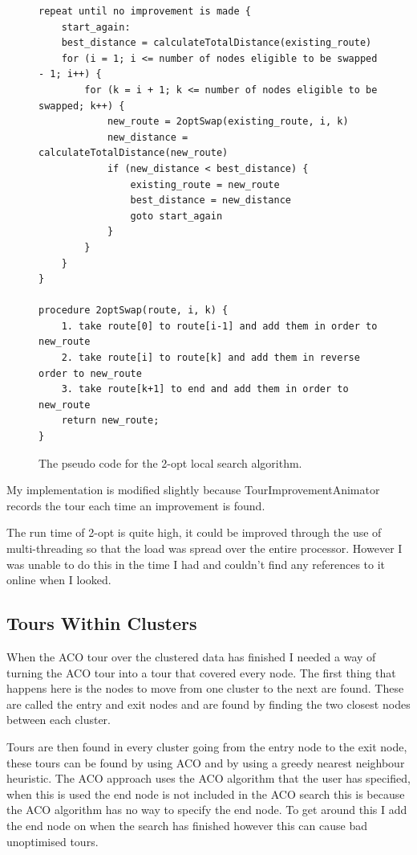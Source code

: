 \begin{figure}
\begin{verbatim}
repeat until no improvement is made {
    start_again:
    best_distance = calculateTotalDistance(existing_route)
    for (i = 1; i <= number of nodes eligible to be swapped - 1; i++) {
        for (k = i + 1; k <= number of nodes eligible to be swapped; k++) {
            new_route = 2optSwap(existing_route, i, k)
            new_distance = calculateTotalDistance(new_route)
            if (new_distance < best_distance) {
                existing_route = new_route
                best_distance = new_distance
                goto start_again
            }
        }
    }
}

procedure 2optSwap(route, i, k) {
    1. take route[0] to route[i-1] and add them in order to new_route
    2. take route[i] to route[k] and add them in reverse order to new_route
    3. take route[k+1] to end and add them in order to new_route
    return new_route;
}

\end{verbatim}
\centering
\caption{The pseudo code for the 2-opt local search algorithm.\cite{2_opt_pseudo_code}}
\label{fig:2-opt-epseudo-code}
\end{figure}

My implementation is modified slightly because TourImprovementAnimator records the tour each time an improvement is found.

The run time of 2-opt is quite high, it could be improved through the use of multi-threading so that the load was spread over the entire processor. However I was unable to do this in the time I had and couldn't find any references to it online when I looked.

\subsection{Tours Within Clusters}

When the ACO tour over the clustered data has finished I needed a way of turning the ACO tour into a tour that covered every node. The first thing that happens here is the nodes to move from one cluster to the next are found. These are called the entry and exit nodes and are found by finding the two closest nodes between each cluster. 

Tours are then found in every cluster going from the entry node to the exit node, these tours can be found by using ACO and by using a greedy nearest neighbour heuristic. The ACO approach uses the ACO algorithm that the user has specified, when this is used the end node is not included in the ACO search this is because the ACO algorithm has no way to specify the end node. To get around this I add the end node on when the search has finished however this can cause bad unoptimised tours.

